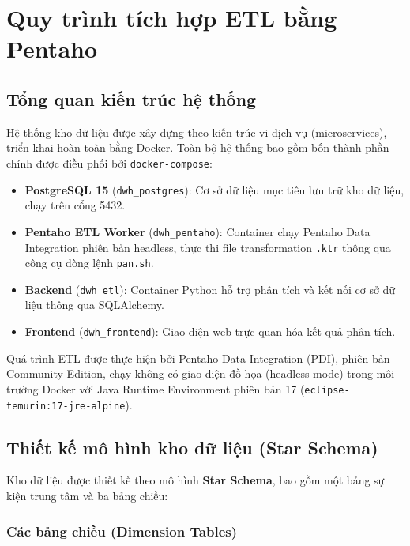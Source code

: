
\section{Quy trình tích hợp ETL bằng Pentaho}

\subsection{Tổng quan kiến trúc hệ thống}

Hệ thống kho dữ liệu được xây dựng theo kiến trúc vi dịch vụ (microservices), triển khai hoàn toàn bằng Docker. Toàn bộ hệ thống bao gồm bốn thành phần chính được điều phối bởi \texttt{docker-compose}:

\begin{itemize}
    \item \textbf{PostgreSQL 15} (\texttt{dwh\_postgres}): Cơ sở dữ liệu mục tiêu lưu trữ kho dữ liệu, chạy trên cổng 5432.
    \item \textbf{Pentaho ETL Worker} (\texttt{dwh\_pentaho}): Container chạy Pentaho Data Integration phiên bản headless, thực thi file transformation \texttt{.ktr} thông qua công cụ dòng lệnh \texttt{pan.sh}.
    \item \textbf{Backend} (\texttt{dwh\_etl}): Container Python hỗ trợ phân tích và kết nối cơ sở dữ liệu thông qua SQLAlchemy.
    \item \textbf{Frontend} (\texttt{dwh\_frontend}): Giao diện web trực quan hóa kết quả phân tích.
\end{itemize}

Quá trình ETL được thực hiện bởi Pentaho Data Integration (PDI), phiên bản Community Edition, chạy không có giao diện đồ họa (headless mode) trong môi trường Docker với Java Runtime Environment phiên bản 17 (\texttt{eclipse-temurin:17-jre-alpine}).


\subsection{Thiết kế mô hình kho dữ liệu (Star Schema)}

Kho dữ liệu được thiết kế theo mô hình \textbf{Star Schema}, bao gồm một bảng sự kiện trung tâm và ba bảng chiều:

\subsubsection{Các bảng chiều (Dimension Tables)}

